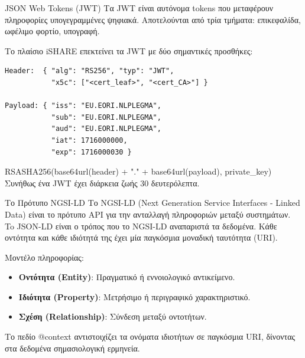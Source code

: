\documentclass[11pt]{beamer}
\newcommand{\en}[1]{\foreignlanguage{english}{#1}}
\begin{document}
\begin{frame}[fragile]{\en{JSON Web Tokens (JWT)}}
Τα \en{JWT} είναι αυτόνομα \en{tokens} που
μεταφέρουν πληροφορίες υπογεγραμμένες ψηφιακά. Αποτελούνται από
τρία τμήματα: επικεφαλίδα, ωφέλιμο φορτίο, υπογραφή.
\bigskip

Το πλαίσιο \en{iSHARE} επεκτείνει τα \en{JWT} με δύο σημαντικές
προσθήκες:

\begin{lstlisting}
Header:  { "alg": "RS256", "typ": "JWT",
           "x5c": ["<cert_leaf>", "<cert_CA>"] }

Payload: { "iss": "EU.EORI.NLPLEGMA",
           "sub": "EU.EORI.NLPLEGMA",
           "aud": "EU.EORI.NLPLEGMA",
           "iat": 1716000000,
           "exp": 1716000030 }
\end{lstlisting}

\textlatin{\textlatin{RSASHA256(base64url(header) + "." + base64url(payload), private\_key)}} \\
Συνήθως ένα \en{JWT} έχει διάρκεια ζωής 30 δευτερόλεπτα.
\end{frame}

\begin{frame}{Το Πρότυπο \en{NGSI-LD}}
Το \en{NGSI-LD} (\en{Next Generation Service Interfaces - Linked Data}) είναι το πρότυπο \en{API}
για την ανταλλαγή πληροφοριών μεταξύ συστημάτων. \\

To \textlatin{JSON-LD} είναι ο τρόπος που το \en{NGSI-LD} αναπαριστά τα δεδομένα.
Kάθε οντότητα και κάθε ιδιότητά της έχει μία παγκόσμια μοναδική ταυτότητα (\en{URI}).
\bigskip

Μοντέλο πληροφορίας:
\begin{itemize}
    \item \textbf{Οντότητα (\en{Entity})}: Πραγματικό ή εννοιολογικό αντικείμενο.
    \item \textbf{Ιδιότητα (\en{Property})}: Μετρήσιμο ή περιγραφικό χαρακτηριστικό.
    \item \textbf{Σχέση (\en{Relationship})}: Σύνδεση μεταξύ οντοτήτων.
\end{itemize}
\bigskip

Το πεδίο \textlatin{@context} αντιστοιχίζει τα ονόματα
ιδιοτήτων σε παγκόσμια \en{URI}, δίνοντας στα δεδομένα σημασιολογική ερμηνεία.
\end{frame}

\end{document}
